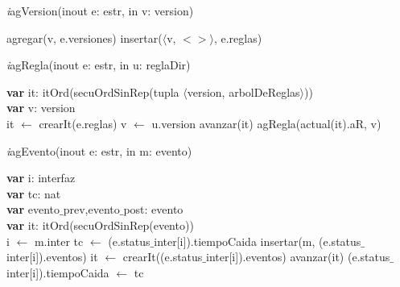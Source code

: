 \textit{i}agVersion(inout e: estr, in v: version)\\
\begin{algorithm}[H]
\BlankLine
agregar(v, e.versiones)
insertar($\langle$v, $<>\rangle$, e.reglas)
\end{algorithm}


\textit{i}agRegla(inout e: estr, in u: reglaDir)\\
\begin{algorithm}[H]
\BlankLine
\textbf{var} it: itOrd(secuOrdSinRep(tupla $\langle$version, arbolDeReglas$\rangle$))\\
\textbf{var} v: version\\
\BlankLine
it $\leftarrow$ crearIt(e.reglas) 
v  $\leftarrow$ u.version 
\BlankLine
{}
{avanzar(it)}
agRegla(actual(it).aR, v) 
\end{algorithm}

\newpage
\textit{i}agEvento(inout e: estr, in m: evento)\\
\begin{algorithm}[H]
\BlankLine
\textbf{var} i: interfaz\\
\textbf{var} tc: nat\\
\textbf{var} evento$\_$prev,evento$\_$post: evento\\
\textbf{var} it: itOrd(secuOrdSinRep(evento)) \\
\BlankLine
i $\leftarrow$ m.inter 
\BlankLine
tc $\leftarrow$ (e.status$\_$inter[i]).tiempoCaida 
\BlankLine
insertar(m, (e.status$\_$inter[i]).eventos) 
\BlankLine
it $\leftarrow$ crearIt((e.status$\_$inter[i]).eventos) 
\BlankLine
{}
	{avanzar(it) 
	 }
(e.status$\_$inter[i]).tiempoCaida $\leftarrow$ tc
\end{algorithm}



